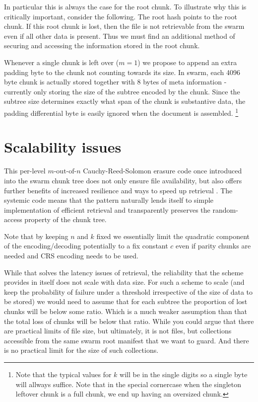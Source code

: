 \documentclass[12pt]{article}
\begin{document}
{In particular this is always the case for the root chunk. To illustrate why this is critically important, consider the following. The root hash points to the root chunk. If this root chunk is lost, then the file is not retrievable from the swarm even if all other data is present. Thus we must find an additional method of securing and accessing the information stored in the root chunk.

Whenever a single chunk is left over ($m=1$) we propose to append an extra padding byte to the chunk not counting towards its size. In swarm, each 4096 byte chunk is actually stored together with 8 bytes of meta information - currently only storing the size of the subtree encoded by the chunk. Since the subtree size determines exactly what span of the chunk is substantive data, the padding differential byte is easily ignored when the document is assembled.%
%
\footnote{%
Note that the typical values for $k$ will be in the single digits so a single byte will allways suffice. Note that in the special cornercase when the singleton leftover chunk is a full chunk, we end up having an oversized chunk.
}

\section{Scalability issues}

This per-level $m\text{-out-of-}n$ Cauchy-Reed-Solomon erasure code once introduced into the swarm chunk tree does not only ensure file availability, but also offers further benefits of increased resilience and ways to speed up retrieval \cite{ethersphere2016sw3}.
The systemic code means that the pattern naturally lends itself to simple implementation of efficient retrieval and transparently preserves the random-access property of the chunk tree.

Note that by keeping $n$ and $k$ fixed we essentially limit the quadratic component of the encoding/decoding potentially to a fix constant $c$ even if parity chunks are needed and CRS encoding needs to be used.

While that solves the latency issues of retrieval, the reliability that the scheme provides in itself does not scale with data size. For such a scheme to scale (and keep the probability of failure under a threshold irrespective of the size of data to be stored) we would need to assume that for each subtree the proportion of lost chunks will be below some ratio. Which is a much weaker assumption than that the total loss of chunks will be below that ratio. While you could argue that there are practical limits of file size, but ultimately, it is not files, but collections accessible from the same swarm root manifest that we want to guard. And there is no practical limit for the size of such collections.



}
\end{document}
